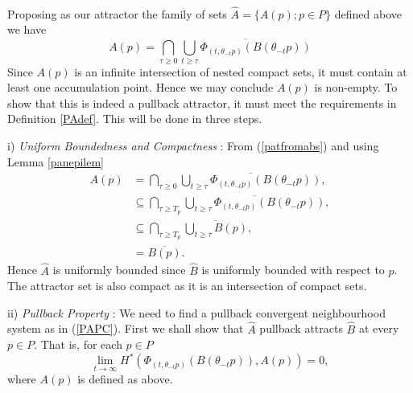 \begin{prf}
  \hspace{3mm} \\
  \hspace*{3mm} Proposing as our attractor the family of sets $\hat{A} =
  \{ A(p); p \in P \}$ defined above we have
  \[ A(p) = \bigcap_{\tau \geq 0} \overline{\bigcup_{t \geq \tau}
            \Phi_{(t,\theta_{-t}p)}(B(\theta_{-t}p))} \]
  Since $A(p)$ is an infinite intersection of nested compact sets, it must
  contain at least one accumulation point. Hence we may conclude $A(p)$ is
  non-empty. To show that this is indeed a pullback attractor, it must meet the
  requirements in Definition \ref{PAdef}. This will be done in three steps.

  \hspace*{3mm} i) {\em Uniform Boundedness and Compactness} : From
  (\ref{patfromabs}) and using Lemma \ref{panepilem}
  \begin{align*}
  A(p) &= \bigcap_{\tau \geq 0} \overline{\bigcup_{t \geq \tau}
            \Phi_{(t,\theta_{-t}p)}(B(\theta_{-t}p))}, \\
  &\subseteq \bigcap_{\tau \geq T_p} \overline{\bigcup_{t \geq \tau}
            \Phi_{(t,\theta_{-t}p)}(B(\theta_{-t}p))}, \\
  &\subseteq \bigcap_{\tau \geq T_p} \overline{\bigcup_{t \geq \tau}
            B(p)}, \\
  &= \overline{B(p)}.
  \end{align*}
  Hence $\hat{A}$ is uniformly bounded since $\hat{B}$ is uniformly bounded
  with respect to $p$. The attractor set is also compact as it is an
  intersection of compact sets.

  \hspace*{3mm} ii) {\em Pullback Property} : We need to find a pullback
  convergent neighbourhood system as in (\ref{PAPC}). First we shall show
  that $\hat{A}$ pullback attracts $\hat{B}$ at every $p \in P$. That is,
  for each $p \in P$
  \begin{equation}
  \label{abscatp2}
    \lim_{t \to \infty} H^* (\Phi_{(t, \theta_{-t}p)} (B(\theta_{-t}p)),
           A(p)) = 0,
  \end{equation}
  where $A(p)$ is defined as above.


\end{prf}
